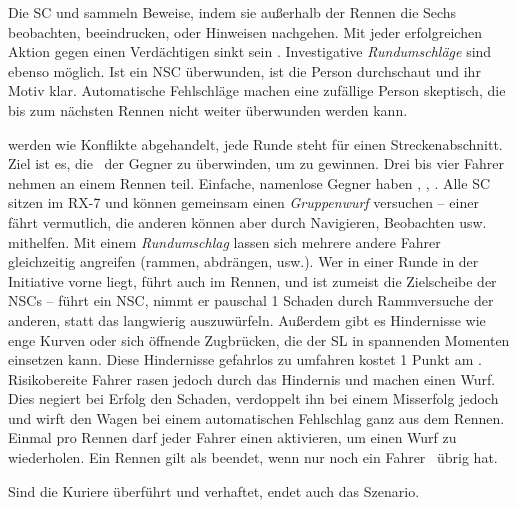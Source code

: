 {	

		\noindent
		Die SC  und sammeln Beweise, indem sie außerhalb der Rennen die Sechs beobachten, beeindrucken, oder Hinweisen nachgehen. Mit jeder erfolgreichen Aktion gegen einen Verdächtigen sinkt sein \HD. Investigative \emph{Rundumschläge} sind ebenso möglich. Ist ein NSC überwunden, ist die Person durchschaut und ihr Motiv klar. Automatische Fehlschläge machen eine zufällige Person skeptisch, die bis zum nächsten Rennen nicht weiter überwunden werden kann.

		 werden wie Konflikte abgehandelt, jede Runde steht für einen Streckenabschnitt. Ziel ist es, die \HD\ der Gegner zu überwinden, um zu gewinnen. Drei bis vier Fahrer nehmen an einem Rennen teil. Einfache, namenlose Gegner haben , , . Alle SC sitzen im RX-7 und können gemeinsam einen \emph{Gruppenwurf} versuchen -- einer fährt vermutlich, die anderen können aber durch Navigieren, Beobachten usw. mithelfen. Mit einem \emph{Rundumschlag} lassen sich mehrere andere Fahrer gleichzeitig angreifen (rammen, abdrängen, usw.). Wer in einer Runde in der Initiative vorne liegt, führt auch im Rennen, und ist zumeist die Zielscheibe der NSCs -- führt ein NSC, nimmt er pauschal 1 Schaden durch Rammversuche der anderen, statt das langwierig auszuwürfeln. Außerdem gibt es Hindernisse wie enge Kurven oder sich öffnende Zugbrücken, die der SL in spannenden Momenten einsetzen kann. Diese Hindernisse gefahrlos zu umfahren kostet 1 Punkt am \HD. Risikobereite Fahrer rasen jedoch durch das Hindernis und machen einen Wurf. Dies negiert bei Erfolg den Schaden, verdoppelt ihn bei einem Misserfolg jedoch und wirft den Wagen bei einem automatischen Fehlschlag ganz aus dem Rennen. Einmal pro Rennen darf jeder Fahrer einen  aktivieren, um einen Wurf zu wiederholen. Ein Rennen gilt als beendet, wenn nur noch ein Fahrer \HD\ übrig hat.


		\noindent
		Sind die Kuriere überführt und verhaftet, endet auch das Szenario.

}

